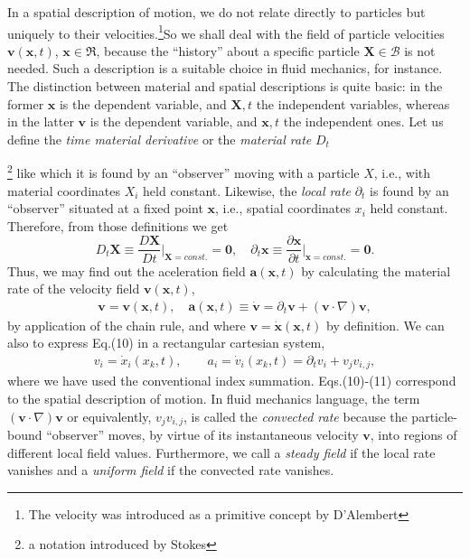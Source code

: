 \documentclass[12pt]{article}
\begin{document}
In a spatial description of motion, we do not relate directly to  particles but  uniquely to their velocities.{\footnote {The velocity was introduced as a primitive concept by D'Alembert\cite{cite:D'Alembert}}}So we shall deal with the  field of particle velocities $\mathbf{v}(\mathbf{x},t)$, $\mathbf{x}\in \Re$, because the ``history'' about a specific particle $\mathbf{X}\in\mathscr{B}$ is not needed. Such a description  is a suitable choice in fluid mechanics, for instance. The distinction between material and spatial descriptions is quite basic: in the former $\mathbf{x}$ is the dependent variable, and $\mathbf{X},t$ the independent variables, whereas in the latter $\mathbf{v}$ is the dependent variable, and $\mathbf{x},t$ the independent ones. Let us define the {\em time material derivative} or the {\em material rate} $D_t${\footnote {a notation introduced by Stokes\cite{cite:Stokes}} like which it is found by an ``observer'' moving with a particle $X$, i.e., with material coordinates $X_i$ held constant. Likewise, the {\em local rate} $\partial_t$ is found by an ``observer'' situated at a fixed point $\mathbf{x}$, i.e., spatial coordinates $x_i$ held constant. Therefore, from those definitions we get
\[D_t\mathbf{X}\equiv\frac{D\mathbf{X}}{Dt}\bigg|_{\mathbf{X}=const.}=\mathbf{0}, \quad \partial_t\mathbf{x}\equiv\frac{\partial\mathbf{x}}{\partial{t}}\bigg|_{\mathbf{x}=const.}=\mathbf{0}.\]
Thus, we may find out the aceleration field $\mathbf{a}(\mathbf{x},t)$ by calculating the material rate of the velocity field $\mathbf{v}(\mathbf{x},t)$,
\begin{align}
\mathbf{v}=\mathbf{v}(\mathbf{x},t), \quad \mathbf{a}(\mathbf{x},t)\equiv\mathbf{\dot{v}}=\partial_t{\mathbf{v}}+(\mathbf{v}\cdot\nabla)\mathbf{v},
\end{align}
by application of the chain rule, and where $\mathbf{v}=\mathbf{\dot{x}}(\mathbf{x},t)$ by definition. We can also to express  Eq.(10) in a rectangular cartesian system,
\begin{align}
v_i=\dot{x}_i(x_k,t), \qquad a_i=\dot{v}_i(x_k,t)=\partial_t{v_i}+v_jv_{i,j},
\end{align}
where we have used the conventional index summation. Eqs.(10)-(11) correspond to the spatial description of  motion. In fluid mechanics language, the term $(\mathbf{v}\cdot\nabla)\mathbf{v}$ or equivalently, $v_jv_{i,j}$,  is called the {\em convected rate} because the particle-bound ``observer'' moves, by virtue of its instantaneous velocity $\mathbf{v}$, into regions of different local field values. Furthermore, we call a {\em steady field} if the local rate vanishes and a {\em uniform field} if the convected rate vanishes.

}
\end{document}
